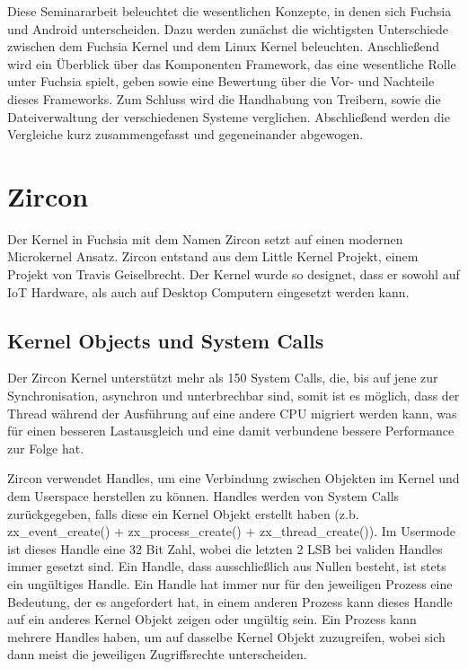 \documentclass[a4paper]{scrartcl}
\begin{document}
Diese Seminararbeit beleuchtet die wesentlichen Konzepte, in denen sich Fuchsia und Android unterscheiden. Dazu werden zunächst die wichtigsten Unterschiede zwischen dem Fuchsia Kernel und dem Linux Kernel beleuchten. Anschließend wird ein Überblick über das Komponenten Framework, das eine wesentliche Rolle unter Fuchsia spielt, geben sowie eine Bewertung über die Vor- und Nachteile dieses Frameworks. Zum Schluss wird die Handhabung von Treibern, sowie die Dateiverwaltung der verschiedenen Systeme verglichen. Abschließend werden die Vergleiche kurz zusammengefasst und gegeneinander abgewogen.
\section{Zircon}
Der Kernel in Fuchsia mit dem Namen Zircon setzt auf einen modernen Microkernel Ansatz. Zircon entstand aus dem Little Kernel Projekt, einem Projekt von Travis Geiselbrecht. Der Kernel wurde so designet, dass er sowohl auf IoT Hardware, als auch auf Desktop Computern eingesetzt werden kann. \cite{DaveAltavilla.30.Juni2019}
\subsection{Kernel Objects und System Calls}
Der Zircon Kernel unterstützt mehr als 150 System Calls, die, bis auf jene zur Synchronisation, asynchron und unterbrechbar sind,\cite{Fuchsia.Zircon.Systemcalls} somit ist es möglich, dass der Thread während der Ausführung auf eine andere CPU migriert werden kann, was für einen besseren Lastausgleich und eine damit verbundene bessere Performance zur Folge hat.

Zircon verwendet Handles, um eine Verbindung zwischen Objekten im Kernel und dem Userspace herstellen zu können. Handles werden von System Calls zurückgegeben, falls diese ein Kernel Objekt erstellt haben (z.b. zx\_event\_create() + zx\_process\_create() + zx\_thread\_create()). Im Usermode ist dieses Handle eine 32 Bit Zahl, wobei die letzten 2 LSB bei validen Handles immer gesetzt sind. Ein Handle, dass ausschließlich aus Nullen besteht, ist stets ein ungültiges Handle. Ein Handle hat immer nur für den jeweiligen Prozess eine Bedeutung, der es angefordert hat, in einem anderen Prozess kann dieses Handle auf ein anderes Kernel Objekt zeigen oder ungültig sein. Ein Prozess kann mehrere Handles haben, um auf dasselbe Kernel Objekt zuzugreifen, wobei sich dann meist die jeweiligen Zugriffsrechte unterscheiden.\cite{Fuchsia.Zircon.Handles}
\end{document}
